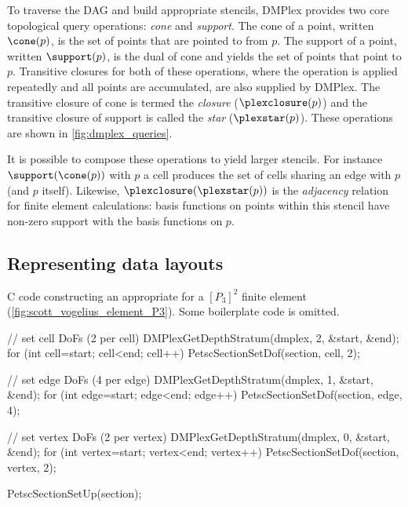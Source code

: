 \documentclass[thesis]{subfiles}
\begin{document}
To traverse the DAG and build appropriate stencils, DMPlex provides two core topological query operations: \emph{cone} and \emph{support}.
The cone of a point, written $\cone(p)$, is the set of points that are pointed to from $p$.
The support of a point, written $\support(p)$, is the dual of cone and yields the set of points that point to $p$.
Transitive closures for both of these operations, where the operation is applied repeatedly and all points are accumulated, are also supplied by DMPlex.
The transitive closure of cone is termed the \emph{closure} ($\plexclosure(p)$) and the transitive closure of support is called the \emph{star} ($\plexstar(p)$).
These operations are shown in \cref{fig:dmplex_queries}.

It is possible to compose these operations to yield larger stencils.
For instance $\support(\cone(p))$ with $p$ a cell produces the set of cells sharing an edge with $p$ (and $p$ itself).
Likewise, $\plexclosure(\plexstar(p))$ is the \textit{adjacency} relation for finite element calculations: basis functions on points within this stencil have non-zero support with the basis functions on $p$.

\subsection{Representing data layouts}
\label{sec:dmplex_data_layout}

\begin{listing}
  \centering

  \caption{
    C code constructing an appropriate  for a $[P_3]^2$ finite element (\cref{fig:scott_vogelius_element_P3}).
    Some boilerplate code is omitted.
  }

  \begin{minipage}{.9\textwidth}
    \begin{calgorithm}
      // set cell DoFs (2 per cell)
      DMPlexGetDepthStratum(dmplex, 2, &start, &end);
      for (int cell=start; cell<end; cell++)
        PetscSectionSetDof(section, cell, 2);

      // set edge DoFs (4 per edge)
      DMPlexGetDepthStratum(dmplex, 1, &start, &end);
      for (int edge=start; edge<end; edge++)
        PetscSectionSetDof(section, edge, 4);

      // set vertex DoFs (2 per vertex)
      DMPlexGetDepthStratum(dmplex, 0, &start, &end);
      for (int vertex=start; vertex<end; vertex++)
        PetscSectionSetDof(section, vertex, 2);

      PetscSectionSetUp(section);
    \end{calgorithm}
  \end{minipage}

  \label{listing:section_p3}
\end{listing}
\end{document}
